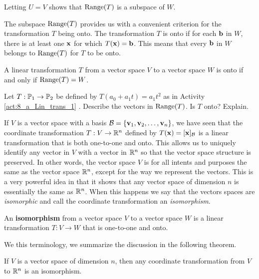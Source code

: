 Letting $U = V$ shows that $\text{Range}(T)$ is a subspace of $W$. 

The subspace $\text{Range}(T)$ provides us with a convenient criterion for the transformation $T$ being onto. The transformation $T$ is onto if for each $\mathbf{b}$ in $W$, there is at least one $\mathbf{x}$ for which $T(\mathbf{x})=\mathbf{b}$. This means that every $\mathbf{b}$ in $W$ belongs to $\text{Range}(T)$ for $T$ to be onto. 

\begin{theorem} \label{thm:8_a_onto_range} A linear transformation $T$ from a vector space $V$ to a vector space $W$ is onto if and only if $\text{Range}(T) = W$.
\end{theorem}

\begin{activity}  Let $T: \mathbb{P}_1 \to \mathbb{P}_2$ be defined by $T(a_0+a_1t) = a_1t^2$ as in Activity \ref{act:8_a_Lin_trans_1} . Describe the vectors in $\text{Range}(T)$. Is $T$ onto? Explain.

\end{activity}


If $V$ is a vector space with a basis $\mathcal{B} = \{\mathbf{v}_1, \mathbf{v}_2, \ldots, \mathbf{v}_n\}$, we have seen that the coordinate transformation $T : V \to \mathbb{R}^n$ defined by $T(\mathbf{x}) = [\mathbf{x}]_{\mathcal{B}}$ is a linear transformation that is both one-to-one and onto. This allows us to uniquely identify any vector in $V$ with a vector in $\mathbb{R}^n$ so that the vector space structure is preserved. In other words, the vector space $V$ is for all intents and purposes the same as the vector space $\mathbb{R}^n$, except for the way we represent the vectors. This is a very powerful idea in that it shows that any vector space of dimension $n$ is essentially the same as $\mathbb{R}^n$. 
 When this happens we say that the vectors spaces are \emph{isomorphic} and call the coordinate transformation an \emph{isomorphism}.

\begin{definition}  An \textbf{isomorphism} from a vector space $V$ to a vector space $W$ is a linear transformation $T : V \to W$ that is one-to-one and onto. 
\end{definition}

We this terminology, we summarize the discussion in the following theorem.

\begin{theorem} If $V$ is a vector space of dimension $n$, then any coordinate transformation from $V$ to $\mathbb{R}^n$ is an isomorphism.
\end{theorem}

